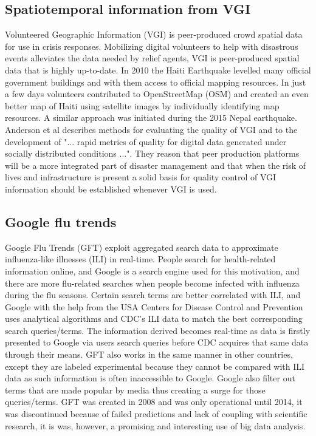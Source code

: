 \subsection{Spatiotemporal information from VGI}
Volunteered Geographic Information (VGI) is peer-produced crowd spatial data for use in crisis responses. Mobilizing digital volunteers to help with disastrous events alleviates the data needed by relief agents, VGI is peer-produced spatial data that is highly up-to-date. In 2010 the Haiti Earthquake levelled many official government buildings and with them access to official mapping resources\cite{palen2015success}. In just a few days volunteers contributed to OpenStreetMap\cite{OpenStreetMap} (OSM) and created an even better map of Haiti using satellite images by individually identifying map resources. A similar approach was initiated during the 2015 Nepal earthquake\cite{hu2016task}. Anderson et al\cite{anderson2018crowd} describes methods for evaluating the quality of VGI and to the development of "... rapid metrics of quality for digital data generated under socially distributed conditions ...". They reason that peer production platforms will be a more integrated part of disaster management and that when the risk of lives and infrastructure is present a solid basis for quality control of VGI information should be established whenever VGI is used.





\subsection{Google flu trends}
Google Flu Trends (GFT) exploit aggregated search data to approximate influenza-like illnesses (ILI) in real-time. People search for health-related information online, and Google is a search engine used for this motivation, and there are more flu-related searches when people become infected with influenza during the flu seasons. Certain search terms are better correlated with ILI, and Google with the help from the USA Centers for Disease Control and Prevention\cite{CDC} uses analytical algorithms and CDC's ILI data to match the best corresponding search queries/terms. The information derived becomes real-time as data is firstly presented to Google via users search queries before CDC acquires that same data through their means. GFT also works in the same manner in other countries, except they are labeled experimental because they cannot be compared with ILI data as such information is often inaccessible to Google. Google also filter out terms that are made popular by media thus creating a surge for those queries/terms. GFT was created in 2008 and was only operational until 2014, it was discontinued because of failed predictions and lack of coupling with scientific research, it is was, however, a promising and interesting use of big data analysis.



